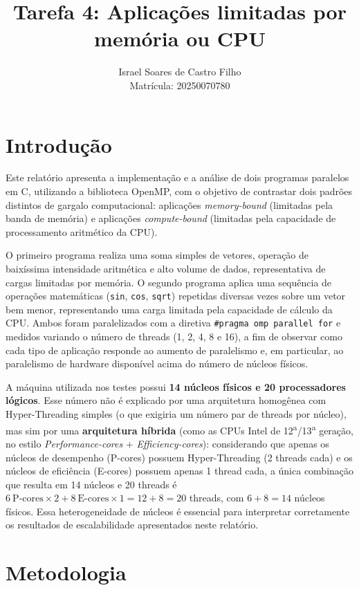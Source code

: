 \documentclass[a4paper,12pt]{article}
\title{Tarefa 4: Aplicações limitadas por memória ou CPU}
\author{Israel Soares de Castro Filho \\ Matrícula: 20250070780}
\date{}
\begin{document}
\maketitle

\section{Introdução}

Este relatório apresenta a implementação e a análise de dois programas paralelos
em C, utilizando a biblioteca OpenMP, com o objetivo de contrastar dois padrões
distintos de gargalo computacional: aplicações \emph{memory-bound} (limitadas
pela banda de memória) e aplicações \emph{compute-bound} (limitadas pela
capacidade de processamento aritmético da CPU).

O primeiro programa realiza uma soma simples de vetores, operação de baixíssima
intensidade aritmética e alto volume de dados, representativa de cargas
limitadas por memória. O segundo programa aplica uma sequência de operações
matemáticas (\texttt{sin}, \texttt{cos}, \texttt{sqrt}) repetidas diversas vezes
sobre um vetor bem menor, representando uma carga limitada pela capacidade de
cálculo da CPU. Ambos foram paralelizados com a diretiva
\texttt{\#pragma omp parallel for} e medidos variando o número de threads
(1, 2, 4, 8 e 16), a fim de observar como cada tipo de aplicação responde ao
aumento de paralelismo e, em particular, ao paralelismo de hardware
disponível acima do número de núcleos físicos.

A máquina utilizada nos testes possui \textbf{14 núcleos físicos e 20
processadores lógicos}. Esse número não é explicado por uma arquitetura
homogênea com Hyper-Threading simples (o que exigiria um número par de
threads por núcleo), mas sim por uma \textbf{arquitetura híbrida} (como as
CPUs Intel de 12\textsuperscript{a}/13\textsuperscript{a} geração, no estilo
\emph{Performance-cores} + \emph{Efficiency-cores}): considerando que apenas
os núcleos de desempenho (P-cores) possuem Hyper-Threading (2 threads cada) e
os núcleos de eficiência (E-cores) possuem apenas 1 thread cada, a única
combinação que resulta em 14 núcleos e 20 threads é
$6~\text{P-cores} \times 2 + 8~\text{E-cores} \times 1 = 12 + 8 = 20$ threads,
com $6 + 8 = 14$ núcleos físicos. Essa heterogeneidade de núcleos é essencial
para interpretar corretamente os resultados de escalabilidade apresentados
neste relatório.

\section{Metodologia}
\end{document}
